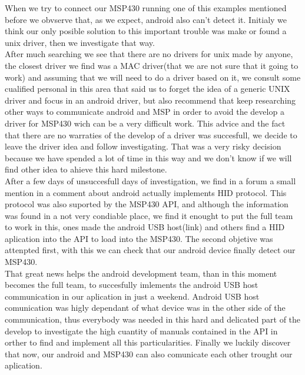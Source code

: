 		When we try to connect our MSP430 running one of this examples mentioned before we obvserve that, as we expect, android also can't detect it. Initialy we think our only posible solution to this important trouble was make or found a unix driver, then we investigate that way. \\

		After much searching we see that there are no drivers for unix made by anyone, the closest driver we find was a MAC driver(that we are not sure that it going to work) and assuming that we will need to do a driver based on it, we consult some cualified personal in this area that said us to forget the idea of a generic UNIX driver and focus in an android driver, but also recommend that keep researching other ways to communicate android and MSP in order to avoid the develop a driver for MSP430 wich can be a very difficult work. This advice and the fact that there are no warraties of the develop of a driver was succesfull, we decide to leave the driver idea and follow investigating. That was a very risky decision because we have spended a lot of time in this way and we don't know if we will find other idea to ahieve this hard milestone.\\

		After a few days of unsuccesfull days of investigation, we find in a forum a small mention in a comment about android actually implements HID protocol. This protocol was also suported by the MSP430 API, and although the information was found in a not very condiable place, we find it enought to put the full team to work in this, ones made the android USB host(link) and others find a HID aplication into the API to load into the MSP430. The second objetive was attenpted first, with this we can check that our android device finally detect our MSP430. \\

		That great news helps the android development team, than in this moment becomes the full team, to succesfully imlements the android USB host communication in our aplication in just a weekend. Android USB host comunication was higly dependant of what device was in the other side of the communication, thus everybody was needed in this hard and delicated part of the develop to investigate the high cuantity of manuals contained in the API in orther to find and implement all this particularities. Finally we luckily discover that now, our android and MSP430 can also comunicate each other trought our aplication. \\

